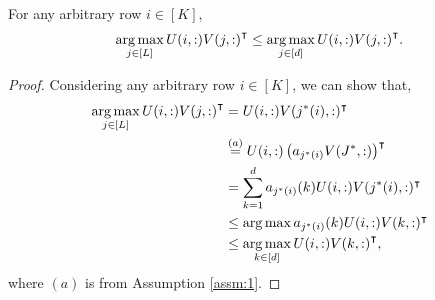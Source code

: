 \documentclass[twoside]{article}
\begin{document}
\begin{lemma}
For any arbitrary row $i\in[K]$, 
\begin{align*}
\mathop{\rm arg\,max}_{j\in[L]} U(i,:){V(j,:)}^{\intercal} \leq \mathop{\rm arg\,max}_{j\in[d]} U(i,:){V(j,:)}^{\intercal} . 
\end{align*}
\end{lemma}

\begin{proof}
Considering any arbitrary row $i\in [K]$, we can show that,
\begin{align*}
\mathop{\rm arg\,max}_{j\in[L]} U(i,:){V(j,:)}^{\intercal}  &= U(i,:)V(j^*(i),:)^{\intercal}\\
& \overset{(a)}{=} U(i,:)\left(a_{j^*(i)}V(J^*,:)\right)^{\intercal}\\
& = \sum_{k=1}^{d}a_{j^*(i)}(k)U(i,:)V(j^*(i),:)^{\intercal}\\
& \leq \mathop{\rm arg\,max} a_{j^*(i)}(k)U(i,:)V(k,:)^{\intercal} \\
& \leq \mathop{\rm arg\,max}_{k\in[d]}U(i,:){V(k,:)}^{\intercal}   ,
\end{align*}
where $(a)$ is from Assumption \ref{assm:1}.
\end{proof}



%


\end{document}
